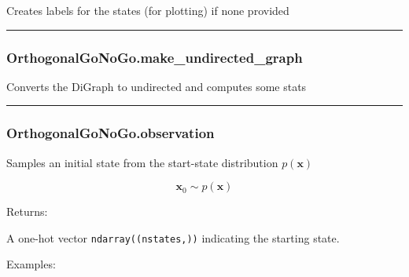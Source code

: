 \begin{Shaded}
\begin{Highlighting}[]
\NormalTok{)}
\end{Highlighting}
\end{Shaded}

Creates labels for the states (for plotting) if none provided

\begin{center}\rule{0.5\linewidth}{\linethickness}\end{center}

\subsubsection{OrthogonalGoNoGo.make\_undirected\_graph}\label{orthogonalgonogo.make_undirected_graph}

\begin{Shaded}
\begin{Highlighting}[]
\NormalTok{)}
\end{Highlighting}
\end{Shaded}

Converts the DiGraph to undirected and computes some stats

\begin{center}\rule{0.5\linewidth}{\linethickness}\end{center}

\subsubsection{OrthogonalGoNoGo.observation}\label{orthogonalgonogo.observation}

\begin{Shaded}
\begin{Highlighting}[]
\NormalTok{)}
\end{Highlighting}
\end{Shaded}

Samples an initial state from the start-state distribution
\(p(\mathbf x)\)

\[
\mathbf x_0 \sim p(\mathbf x)
\]

Returns:

A one-hot vector \texttt{ndarray((nstates,))} indicating the starting
state.

Examples:

